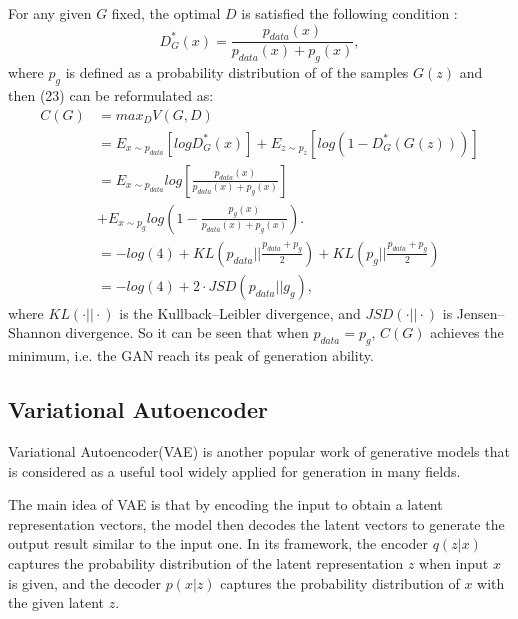 \documentclass[conference]{IEEEtran}
\begin{document}
For any given $G$ fixed, the optimal $D$ is satisfied the following condition :
\begin{equation}
    D^*_G(x)=\frac{p_{data}(x)}{p_{data}(x) + p_{g}(x)},
\end{equation}
where $ p_{g}$ is defined as a probability distribution of of the samples $G(z)$ and then (23) can be reformulated as:
\begin{equation}
    \begin{split}
        C(G) &= max_DV(G, D)\\
            &= E_{x \sim p_{data}}[logD^*_G(x)] + E_{z \sim p_{z}}[log(1-D^*_G(G(z)))]\\
            &= E_{x \sim p_{data}}log[\frac{p_{data}(x)}{p_{data}(x) + p_{g}(x)}]\\
            &+ E_{x \sim p_{g}}log(1-\frac{p_{g}(x)}{p_{data}(x) + p_{g}(x)}).\\
            &= -log(4) +KL(p_{data}||\frac{p_{data}+p_g}{2})+KL(p_{g}||\frac{p_{data}+p_g}{2})\\
            &= -log(4)+2\cdot JSD(p_{data}||g_g),
    \end{split}
\end{equation}
where $KL(\cdot||\cdot)$ is the Kullback–Leibler divergence, and $JSD(\cdot||\cdot)$ is Jensen–Shannon divergence. So it can be seen that when $p_{data} = p_g$, $C(G)$ achieves the minimum, i.e. the GAN reach its peak of generation ability.

\subsection{Variational Autoencoder\cite{b33}}
Variational Autoencoder(VAE) is another popular work of generative models that is considered as a useful tool widely applied for generation in many fields.

The main idea of VAE is that by encoding the input to obtain a latent representation vectors, the model then decodes the latent vectors to generate the output result similar to the input one. In its framework, the encoder $q(z|x)$ captures the probability distribution of the latent representation $z$ when input $x$ is given, and the decoder $p(x|z)$ captures the probability distribution of $x$ with the given latent $z$. 
\end{document}
